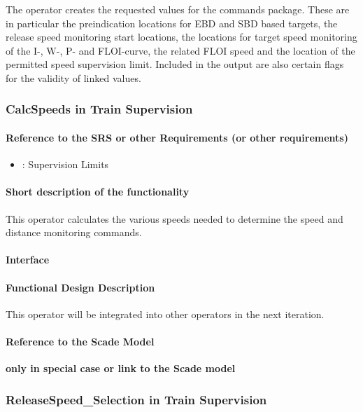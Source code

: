 The operator creates the requested values for the commands package. These are in particular the preindication locations for EBD and SBD based targets, the release speed monitoring start locations, the locations for target speed monitoring of the I-, W-, P- and FLOI-curve, the related FLOI speed and the location of the permitted speed supervision limit. Included in the output are also certain flags for the validity of linked values.


\subsubsection{CalcSpeeds in Train Supervision}
\paragraph{Reference to the SRS or other Requirements (or other requirements)}
\begin{itemize}
	\item \cite[Chapt.~3.13.9]{subset-026}: Supervision Limits 
\end{itemize}
\paragraph{Short description of the functionality}
This operator calculates the various speeds needed to determine the speed and distance monitoring commands.
\paragraph{Interface}
\paragraph{Functional Design Description}
This operator will be integrated into other operators in the next iteration.
\paragraph{Reference to the Scade Model}
\textbf{only in special case or link to the Scade model}

\subsubsection{ReleaseSpeed\_Selection in Train Supervision}
